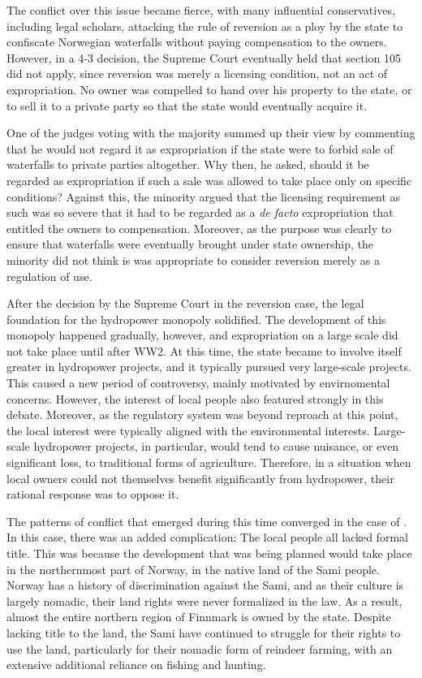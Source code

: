 The conflict over this issue became fierce, with many influential conservatives, including legal scholars, attacking the rule of reversion as a ploy by the state to confiscate Norwegian waterfalls without paying compensation to the owners. However, in a 4-3 decision, the Supreme Court eventually held that section 105 did not apply, since reversion was merely a licensing condition, not an act of expropriation. No owner was compelled to hand over his property to the state, or to sell it to a private party so that the state would eventually acquire it.

One of the judges voting with the majority summed up their view by commenting that he would not regard it as expropriation if the state were to forbid sale of waterfalls to private parties altogether. Why then, he asked, should it be regarded as expropriation if such a sale was allowed to take place only on specific conditions? Against this, the minority argued that the licensing requirement as such was so severe that it had to be regarded as a {\it de facto} expropriation that entitled the owners to compensation. Moreover,  as the purpose was clearly to ensure that waterfalls were eventually brought under state ownership, the minority did not think is was appropriate to consider reversion merely as a regulation of use.

After the decision by the Supreme Court in the reversion case, the legal foundation for the hydropower monopoly solidified. The development of this monopoly happened gradually, however, and expropriation on a large scale did not take place until after WW2. At this time, the state became to involve itself greater in hydropower projects, and it typically pursued very large-scale projects. This caused a new period of controversy, mainly motivated by envirnomental concerns. However, the interest of local people also featured strongly in this debate. Moreover, as the regulatory system was beyond reproach at this point, the local interest were typically aligned with the environmental interests. Large-scale hydropower projects, in particular, would tend to cause nuisance, or even significant loss, to traditional forms of agriculture. Therefore, in a situation when local owners could not themselves benefit significantly from hydropower, their rational response was to oppose it.

The patterns of conflict that emerged during this time converged in the case of \cite{alta8.}. In this case, there was an added complication: The local people all lacked formal title. This was because the development that was being planned would take place in the northernmost part of Norway, in the native land of the Sami people. Norway has a history of discrimination against the Sami, and as their culture is largely nomadic, their land rights were never formalized in the law. As a result, almost the entire northern region of Finnmark is owned by the state. Despite lacking title to the land, the Sami have continued to struggle for their rights to use the land, particularly for their nomadic form of reindeer farming, with an extensive additional reliance on fishing and hunting.

